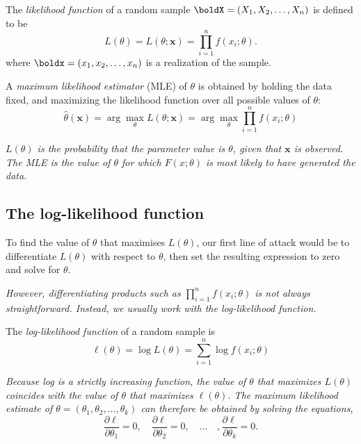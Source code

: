 \begin{definition}
The \emph{likelihood function} of a random sample $\boldX = (X_1,X_2,\ldots,X_n)$ is defined to be
\[
L(\theta) = L(\theta;\mathbf{x}) = \prod_{i=1}^n f(x_i;\theta).
\]
where $\boldx=(x_1,x_2,\ldots,x_n)$ is a realization of the sample.
\end{definition}

\begin{definition}
A \emph{maximum likelihood estimator} (MLE) of $\theta$ is obtained by holding the data fixed, and maximizing the likelihood function over all possible values of $\theta$:
\[
\hat{\theta}(\mathbf{x}) 
	= \arg\max_{\theta} L(\theta;\mathbf{x}) 
	= \arg\max_{\theta} \prod_{i=1}^n f(x_i;\theta)
\]
\end{definition}

\begin{remark}
\bit
\it
$L(\theta)$ is the probability that the parameter value is $\theta$, given that $\mathbf{x}$ is observed.
\it
The MLE is the value of $\theta$ for which $F(x;\theta)$ is \emph{most likely} to have generated the data.
 \eit
\end{remark}

\subsection{The log-likelihood function}

To find the value of $\theta$ that maximises $L(\theta)$, our first line of attack would be to differentiate $L(\theta)$ with respect to $\theta$, then set the resulting expression to zero and solve for $\theta$.

\bit
\it However, differentiating products such as $\prod_{i=1}^n f(x_i;\theta)$ is not always straightforward.
\it Instead, we usually work with the \emph{log-likelihood} function.
\eit

\begin{definition}
The \emph{log-likelihood function} of a random sample is
\[
\ell(\theta) = \log L(\theta) = \sum_{i=1}^n \log f(x_i;\theta)
\]
\end{definition}

\bit
\it
Because log is a strictly increasing function, the value of $\theta$ that maximizes $L(\theta)$ coincides with the value of $\theta$ that maximizes $\ell(\theta)$. 
\it
The maximum likelihood estimate of $\theta=(\theta_1,\theta_2,\ldots,\theta_k)$ can therefore be obtained by solving the equations,
\[
\frac{\partial\ell}{\partial\theta_1}=0,
\quad
\frac{\partial\ell}{\partial\theta_2}=0,
\quad\ldots\quad,
\frac{\partial\ell}{\partial\theta_k}=0.
\]
\eit

